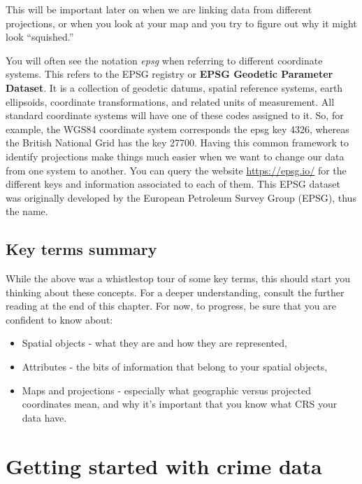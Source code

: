 \documentclass[
]{book}
\providecommand{\tightlist}{%
  \setlength{\itemsep}{0pt}\setlength{\parskip}{0pt}}
\begin{document}
This will be important later on when we are linking data from different projections, or when you look at your map and you try to figure out why it might look ``squished.''

You will often see the notation \emph{epsg} when referring to different coordinate systems. This refers to the EPSG registry or \textbf{EPSG Geodetic Parameter Dataset}. It is a collection of geodetic datums, spatial reference systems, earth ellipsoids, coordinate transformations, and related units of measurement. All standard coordinate systems will have one of these codes assigned to it. So, for example, the WGS84 coordinate system corresponds the epsg key 4326, whereas the British National Grid has the key 27700. Having this common framework to identify projections make things much easier when we want to change our data from one system to another. You can query the website \url{https://epsg.io/} for the different keys and information associated to each of them. This EPSG dataset was originally developed by the European Petroleum Survey Group (EPSG), thus the name.

\hypertarget{key-terms-summary}{%
\subsection{Key terms summary}\label{key-terms-summary}}

While the above was a whistlestop tour of some key terms, this should start you thinking about these concepts. For a deeper understanding, consult the further reading at the end of this chapter. For now, to progress, be sure that you are confident to know about:

\begin{itemize}
\tightlist
\item
  Spatial objects - what they are and how they are represented,
\item
  Attributes - the bits of information that belong to your spatial objects,
\item
  Maps and projections - especially what geographic versus projected coordinates mean, and why it's important that you know what CRS your data have.
\end{itemize}

\hypertarget{getting-started-with-crime-data}{%
\section{Getting started with crime data}\label{getting-started-with-crime-data}}
\end{document}
